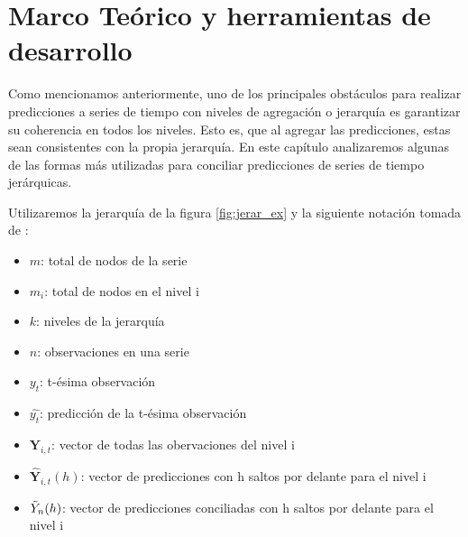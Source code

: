 \chapter{Marco Teórico y herramientas de desarrollo}

Como mencionamos anteriormente, uno de los principales obstáculos para realizar predicciones a series de tiempo con niveles de agregación o jerarquía es garantizar su coherencia en todos los niveles. Esto es, que al agregar las predicciones, estas sean consistentes con la propia jerarquía. En este capítulo analizaremos algunas de las formas más utilizadas para conciliar predicciones de series de tiempo jerárquicas.

Utilizaremos la jerarquía de la figura \ref{fig:jerar_ex} y la siguiente notación tomada de \cite{abolghasemi2020model}:

\begin{itemize}
    \item $m$: total de nodos de la serie 
    \item $m_i$: total de nodos en el nivel i
    \item $k$: niveles de la jerarquía
    \item $n$: observaciones en una serie
    \item $y_t$: t-ésima observación 
    \item $\hat{y_t}$: predicción de la t-ésima observación
    \item $\textbf{Y}_{i,t}$: vector de todas las obervaciones del nivel i
    \item $\hat{\textbf{Y}}_{i,t}(h)$: vector de predicciones con h saltos por delante para el nivel i
    \item $\Tilde{Y}_n(h)$: vector de predicciones conciliadas con h saltos por delante para el nivel i
\end{itemize}

